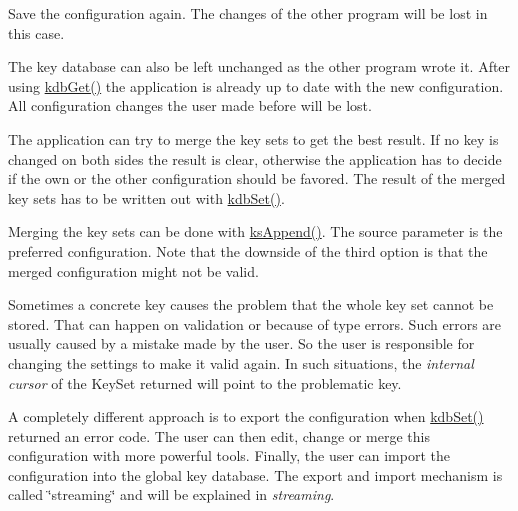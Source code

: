 \begin{DoxyEnumerate}
\item Save the configuration again. The changes of the other program will be lost in this case.
\item The key database can also be left unchanged as the other program wrote it. After using {\ttfamily \hyperlink{group__kdb_ga28e385fd9cb7ccfe0b2f1ed2f62453a1}{kdb\+Get()}} the application is already up to date with the new configuration. All configuration changes the user made before will be lost.
\item The application can try to merge the key sets to get the best result. If no key is changed on both sides the result is clear, otherwise the application has to decide if the own or the other configuration should be favored. The result of the merged key sets has to be written out with {\ttfamily \hyperlink{group__kdb_ga11436b058408f83d303ca5e996832bcf}{kdb\+Set()}}.
\item Merging the key sets can be done with {\ttfamily \hyperlink{group__keyset_ga21eb9c3a14a604ee3a8bdc779232e7b7}{ks\+Append()}}. The source parameter is the preferred configuration. Note that the downside of the third option is that the merged configuration might not be valid.
\end{DoxyEnumerate}

Sometimes a concrete key causes the problem that the whole key set cannot be stored. That can happen on validation or because of type errors. Such errors are usually caused by a mistake made by the user. So the user is responsible for changing the settings to make it valid again. In such situations, the {\itshape internal cursor} of the {\ttfamily Key\+Set} {\ttfamily returned} will point to the problematic key.

A completely different approach is to export the configuration when {\ttfamily \hyperlink{group__kdb_ga11436b058408f83d303ca5e996832bcf}{kdb\+Set()}} returned an error code. The user can then edit, change or merge this configuration with more powerful tools. Finally, the user can import the configuration into the global key database. The export and import mechanism is called \char`\"{}streaming\char`\"{} and will be explained in {\itshape streaming}. 